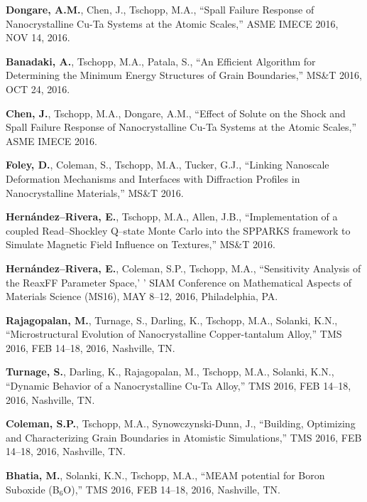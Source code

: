 \begin{cvlist}
\item
\textbf{Dongare, A.M.}, Chen, J., Tschopp, M.A.,  ``Spall Failure Response of Nanocrystalline Cu-Ta Systems at the Atomic Scales,'' ASME IMECE 2016, NOV 14, 2016.

\item
\textbf{Banadaki, A.}, Tschopp, M.A., Patala, S., ``An Efficient Algorithm for Determining the Minimum Energy Structures of Grain Boundaries,'' MS\&T 2016, OCT 24, 2016.

\item
\textbf{Chen, J.}, Tschopp, M.A., Dongare, A.M., ``Effect of Solute on the Shock and Spall Failure Response of Nanocrystalline Cu-Ta Systems at the Atomic Scales,'' ASME IMECE 2016.

\item
\textbf{Foley, D.}, Coleman, S., Tschopp, M.A., Tucker, G.J., ``Linking Nanoscale Deformation Mechanisms and Interfaces with Diffraction Profiles in Nanocrystalline Materials,'' MS\&T 2016.

\item
\textbf{Hern\'andez--Rivera, E.}, Tschopp, M.A., Allen, J.B., ``Implementation of a coupled Read--Shockley Q--state Monte Carlo into the SPPARKS framework to Simulate Magnetic Field Influence on Textures,'' MS\&T 2016.

\item
\textbf{Hern\'andez--Rivera, E.}, Coleman, S.P., Tschopp, M.A., ``Sensitivity Analysis of the ReaxFF Parameter Space,' ' SIAM Conference on Mathematical Aspects of Materials Science (MS16), MAY 8--12, 2016, Philadelphia, PA.

\item
\textbf{Rajagopalan, M.}, Turnage, S., Darling, K.,  Tschopp, M.A., Solanki, K.N., ``Microstructural Evolution of Nanocrystalline Copper-tantalum Alloy,'' TMS 2016, FEB 14--18, 2016, Nashville, TN.

\item
\textbf{Turnage, S.}, Darling, K., Rajagopalan, M., Tschopp, M.A., Solanki, K.N., ``Dynamic Behavior of a Nanocrystalline Cu-Ta Alloy,'' TMS 2016, FEB 14--18, 2016, Nashville, TN.

\item
\textbf{Coleman, S.P.}, Tschopp, M.A., Synowczynski-Dunn, J., ``Building, Optimizing and Characterizing Grain Boundaries in Atomistic Simulations,'' TMS 2016, FEB 14--18, 2016, Nashville, TN.

\item
\textbf{Bhatia, M.}, Solanki, K.N., Tschopp, M.A., ``MEAM potential for Boron Suboxide (B$_6$O),'' TMS 2016, FEB 14--18, 2016, Nashville, TN.


\end{cvlist}
